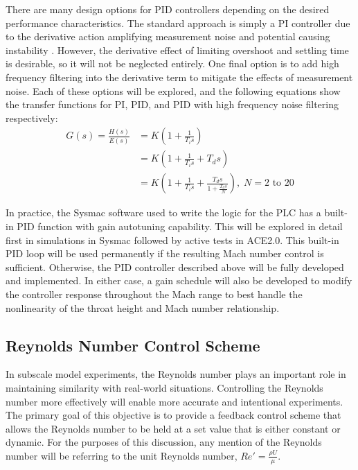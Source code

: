 There are many design options for PID controllers depending on the desired performance characteristics. The standard approach is simply a PI controller due to the derivative action amplifying measurement noise and potential causing instability \cite{fung}. However, the derivative effect of limiting overshoot and settling time is desirable, so it will not be neglected entirely. One final option is to add high frequency filtering into the derivative term to mitigate the effects of measurement noise. Each of these options will be explored, and the following equations show the transfer functions for PI, PID, and PID with high frequency noise filtering respectively:
\begin{subequations}
    \begin{align}
        G(s) = \frac{H(s)}{E(s)} &= K \left(1 + \frac{1}{T_i s}\right) \label{eq:M-PI}\\
                                 &= K \left(1 + \frac{1}{T_i s} + T_d s\right) \label{eq:M-PID}\\
                                 &= K \left(1 + \frac{1}{T_i s} + \frac{T_d s}{1+\frac{T_d s}{N}}\right), \; N=2\textrm{ to }20 \label{eq:M-PID-filter}
    \end{align}
\end{subequations}

In practice, the Sysmac software used to write the logic for the PLC has a built-in PID function with gain autotuning capability. This will be explored in detail first in simulations in Sysmac followed by active tests in ACE2.0. This built-in PID loop will be used permanently if the resulting Mach number control is sufficient. Otherwise, the PID controller described above will be fully developed and implemented. In either case, a gain schedule will also be developed to modify the controller response throughout the Mach range to best handle the nonlinearity of the throat height and Mach number relationship.

\subsection{Reynolds Number Control Scheme}

In subscale model experiments, the Reynolds number plays an important role in maintaining similarity with real-world situations. Controlling the Reynolds number more effectively will enable more accurate and intentional experiments. The primary goal of this objective is to provide a feedback control scheme that allows the Reynolds number to be held at a set value that is either constant or dynamic. For the purposes of this discussion, any mention of the Reynolds number will be referring to the unit Reynolds number, $Re' = \frac{\rho U}{\mu}$.


